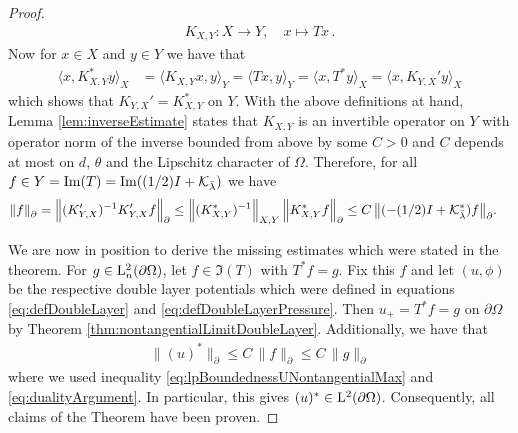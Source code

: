 \begin{proof}
  \begin{align*}
    K_{X,Y} \colon X \to Y, \quad x \mapsto T x \,.
  \end{align*}
  Now for $x \in X$ and $y \in Y$ we have that
  \begin{align*}
    \Big\langle x, K_{X,Y}^* y \Big\rangle_X
    & =\Big\langle K_{X,Y}^{} x, y  \Big\rangle_Y
      =\Big\langle T x, y        \Big\rangle_Y
      =\Big\langle x, T^*y       \Big\rangle_X
      =\Big\langle x, K_{Y,X}' y \Big\rangle_X
  \end{align*}
  which shows that $K_{Y,X}' = K_{X,Y}^*$ on $Y$.
  With the above definitions at hand, Lemma \ref{lem:inverseEstimate} states that $K_{X,Y}^{}$ is an invertible operator on $Y$ with operator norm of the inverse bounded from above by some $C > 0$ and $C$ depends at most on $d$, $\theta$ and the Lipschitz character of $\Omega$.
  Therefore, for all $f \in Y = \operatorname{Im}(T) = \operatorname{Im}((1/2)I + \mathcal{K}_{\bar \lambda})$ we have
  \begin{align}
    \label{eq:dualityArgument}
    \| f\|_\partial^{}
    &= \Big\| (K_{Y,X}')^{-1} K_{Y,X}' f \Big\|_\partial^{}
    \leq  \Big\| (K_{X,Y}^*)^{-1} \Big\|_{X,Y}^{}\, \Big\| K_{X,Y}^* f\Big\|_\partial^{}
    \leq C \, \big\|(-(1/2)I + \mathcal{K}_{\bar \lambda}^*)f \big\|_\partial^{}.
  \end{align}

  We are now in position to derive the missing estimates which were stated in the theorem.
  For $g \in \mathrm{L}^2_n(\partial\Omega)$, let $f \in \Im(T)$ with $T^* f = g$.
  Fix this $f$ and let $(u,\phi)$ be the respective double layer potentials which were defined in equations \eqref{eq:defDoubleLayer} and \eqref{eq:defDoubleLayerPressure}.
  Then $u_+ = T^* f =  g$ on $\partial\Omega$ by Theorem \ref{thm:nontangentialLimitDoubleLayer}.
  Additionally, we have that
  \begin{align*}
    \|(u)^* \|_\partial^{} \leq C \, \|f\|_\partial^{} \leq C\, \| g\|_\partial^{}
  \end{align*}
  where we used inequality \eqref{eq:lpBoundednessUNontangentialMax} and \eqref{eq:dualityArgument}. In particular, this gives $(u)^* \in \mathrm{L}^2(\partial\Omega)$.
  Consequently, all claims of the Theorem have been proven.
\end{proof}

